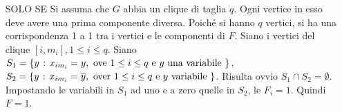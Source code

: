 \documentclass{subfiles}
\begin{document}
\begin{Theorem}
\begin{Proof*}
\begin{itemize}
            \item [SOLO SE] Si assuma che \(G\) abbia un clique di taglia \(q\). Ogni vertice in esso deve avere una prima componente diversa.
                  Poiché si hanno \(q\) vertici, si ha una corrispondenza 1 a 1 tra i vertici e le componenti di \(F\).
                  Siano i vertici del clique \([i, m_{i}], 1 \le i \le q\).
                  Siano \(S_{1} = \set{y}{x_{im_{i}} = y, \text{ove} 1 \le i \le q \text{e} y \text{una variabile}}\),
                  \(S_{2} = \set{y}{x_{im_{i}} = \overline{y}, \text{over} 1 \le i \le q \text{e} y \text{variabile}}\).
                  Risulta ovvio \(S_{1} \cap S_{2} = \emptyset\). Impostando le variabili in \(S_{1}\) ad uno e a zero quelle in \(S_{2}\), le \(F_{i} = 1\). Quindi \(F = 1\).

        \end{itemize}
    \end{Proof*}
\end{Theorem}
\end{document}
